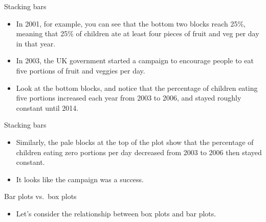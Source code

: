 \documentclass[
  ignorenonframetext,
]{beamer}
\providecommand{\tightlist}{%
  \setlength{\itemsep}{0pt}\setlength{\parskip}{0pt}}
\begin{document}
\begin{frame}{Stacking bars}
\label{stacking-bars-1}
\begin{itemize}
\item
  In 2001, for example, you can see that the bottom two blocks reach
  25\%, meaning that 25\% of children ate at least four pieces of fruit
  and veg per day in that year.
\item
  In 2003, the UK government started a campaign to encourage people to
  eat five portions of fruit and veggies per day.
\item
  Look at the bottom blocks, and notice that the percentage of children
  eating five portions increased each year from 2003 to 2006, and stayed
  roughly constant until 2014.
\end{itemize}
\end{frame}

\begin{frame}{Stacking bars}
\label{stacking-bars-2}
\begin{itemize}
\item
  Similarly, the pale blocks at the top of the plot show that the
  percentage of children eating zero portions per day decreased from
  2003 to 2006 then stayed constant.
\item
  It looks like the campaign was a success.
\end{itemize}
\end{frame}

\begin{frame}{Bar plots vs.~box plots}
\label{bar-plots-vs.-box-plots}
\begin{itemize}
\tightlist
\item
  Let's consider the relationship between box plots and bar plots.
\end{itemize}
\end{frame}
\end{document}
